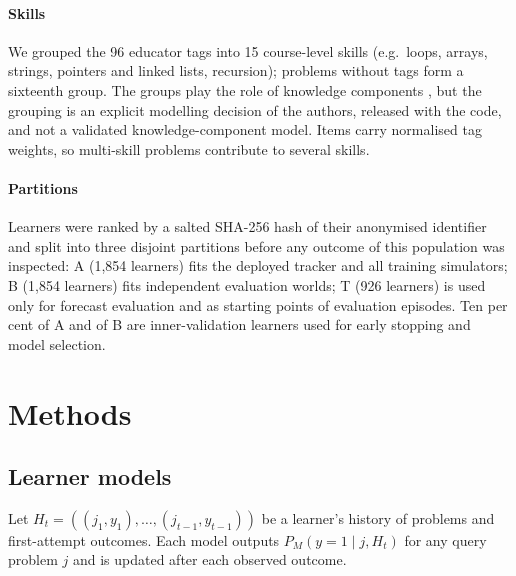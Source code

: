 \documentclass[a4paper,preprint,12pt,authoryear]{elsarticle}
\begin{document}
\paragraph{Skills} We grouped the 96 educator tags into 15 course-level skills (e.g.\ loops, arrays, strings, pointers and linked lists, recursion); problems without tags form a sixteenth group. The groups play the role of knowledge components \citep{koedinger2012kli}, but the grouping is an explicit modelling decision of the authors, released with the code, and not a validated knowledge-component model. Items carry normalised tag weights, so multi-skill problems contribute to several skills.

\paragraph{Partitions} Learners were ranked by a salted SHA-256 hash of their anonymised identifier and split into three disjoint partitions before any outcome of this population was inspected: A (1,854 learners) fits the deployed tracker and all training simulators; B (1,854 learners) fits independent evaluation worlds; T (926 learners) is used only for forecast evaluation and as starting points of evaluation episodes. Ten per cent of A and of B are inner-validation learners used for early stopping and model selection.

\section{Methods}\label{sec:methods}

\subsection{Learner models}\label{sec:learners}

Let $H_t=((j_1,y_1),\dots,(j_{t-1},y_{t-1}))$ be a learner's history of problems and first-attempt outcomes. Each model outputs $P_M(y=1\mid j,H_t)$ for any query problem $j$ and is updated after each observed outcome.
\end{document}
